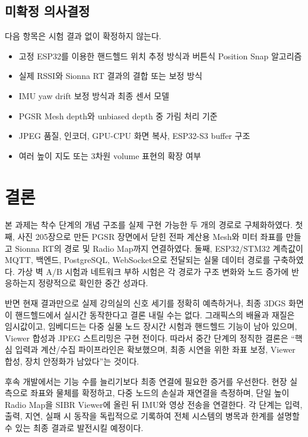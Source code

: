 \documentclass[titlepage]{pnureport}
\begin{document}
\section{미확정 의사결정}

다음 항목은 시험 결과 없이 확정하지 않는다.

\begin{itemize}
  \item 고정 ESP32를 이용한 핸드헬드 위치 추정 방식과 버튼식 Position Snap 알고리즘
  \item 실제 RSSI와 Sionna RT 결과의 결합 또는 보정 방식
  \item IMU yaw drift 보정 방식과 최종 센서 모델
  \item PGSR Mesh depth와 unbiased depth 중 가림 처리 기준
  \item JPEG 품질, 인코더, GPU-CPU 화면 복사, ESP32-S3 buffer 구조
  \item 여러 높이 지도 또는 3차원 volume 표현의 확장 여부
\end{itemize}

\chapter{결론}

본 과제는 착수 단계의 개념 구조를 실제 구현 가능한 두 개의 경로로 구체화하였다. 첫째, 사진 205장으로 만든 PGSR 장면에서 닫힌 전파 계산용 Mesh와 미터 좌표를 만들고 Sionna RT의 경로 및 Radio Map까지 연결하였다. 둘째, ESP32/STM32 계측값이 MQTT, 백엔드, PostgreSQL, WebSocket으로 전달되는 실물 데이터 경로를 구축하였다. 가상 벽 A/B 시험과 네트워크 부하 시험은 각 경로가 구조 변화와 노드 증가에 반응하는지 정량적으로 확인한 중간 성과다.

반면 현재 결과만으로 실제 강의실의 신호 세기를 정확히 예측하거나, 최종 3DGS 화면이 핸드헬드에서 실시간 동작한다고 결론 내릴 수는 없다. 그래픽스의 배율과 재질은 임시값이고, 임베디드는 다중 실물 노드 장시간 시험과 핸드헬드 기능이 남아 있으며, Viewer 합성과 JPEG 스트리밍은 구현 전이다. 따라서 중간 단계의 정직한 결론은 ``핵심 입력과 계산/수집 파이프라인은 확보했으며, 최종 시연을 위한 좌표 보정, Viewer 합성, 장치 안정화가 남았다''는 것이다.

후속 개발에서는 기능 수를 늘리기보다 최종 연결에 필요한 증거를 우선한다. 현장 실측으로 좌표와 물체를 확정하고, 다중 노드의 손실과 재연결을 측정하며, 단일 높이 Radio Map을 SIBR Viewer에 올린 뒤 IMU와 영상 전송을 연결한다. 각 단계는 입력, 출력, 지연, 실패 시 동작을 독립적으로 기록하여 전체 시스템의 병목과 한계를 설명할 수 있는 최종 결과로 발전시킬 예정이다.

\clearpage


\end{document}
